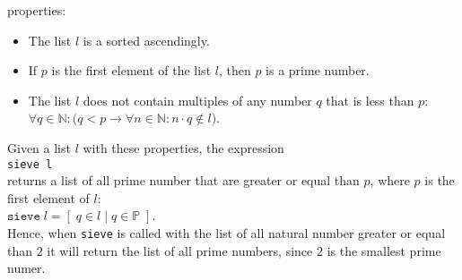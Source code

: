 \documentclass[11pt]{report}
\begin{document}
\begin{enumerate}[(a)]
  properties:
  \begin{itemize}
  \item The list $l$ is a sorted ascendingly.
  \item If $p$ is the first element of the list $l$, then $p$ is a prime number.
  \item The list $l$ does not contain multiples of any number $q$ that is less than $p$:
    \\[0.2cm]
    \hspace*{1.3cm}
    $\forall q \in \mathbb{N}: \bigl(q < p \rightarrow \forall n \in \mathbb{N}: n \cdot q \not\in l\bigr)$.
  \end{itemize}
  Given a list $l$ with these properties, the expression
  \\[0.2cm]
  \hspace*{1.3cm}
  \texttt{sieve l}
  \\[0.2cm]
  returns a list of all prime number that are greater or equal than $p$, where $p$ is the first element of $l$: 
  \\[0.2cm]
  \hspace*{1.3cm}
  $\mathtt{sieve}\;l = [\; q \in l \mid q \in \mathbb{P}\;]$.
  \\[0.2cm]
  Hence, when \texttt{sieve} is called with the list of all natural number greater or equal than $2$
  it will return the list of all prime numbers, since $2$ is the smallest  prime numer.


\end{enumerate}
\end{document}
